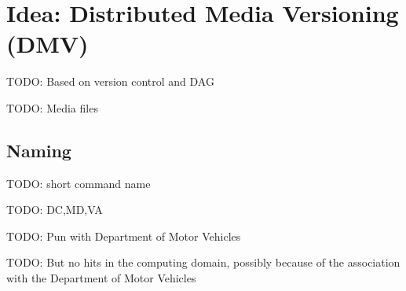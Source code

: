 \chapter{Idea: Distributed Media Versioning (DMV)}

TODO: Based on version control and DAG

TODO: Media files


\section{Naming}

TODO: short command name

TODO: DC,MD,VA

TODO: Pun with Department of Motor Vehicles

TODO: But no hits in the computing domain, possibly because of the association
with the Department of Motor Vehicles
